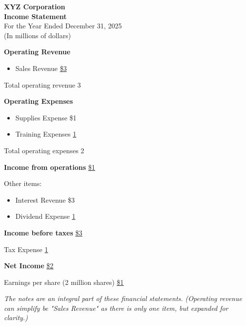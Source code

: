 \small
\begin{tcolorbox}[colframe=black,colback=white,title=Example Income Statement (Classified by Operating \& Non-operating)]
    \begin{center}
        \textbf{XYZ Corporation}\\
        \textbf{Income Statement}\\
        For the Year Ended December 31, 2025\\
        (In millions of dollars)
    \end{center}

    \textbf{Operating Revenue}
    \begin{itemize}[label={}, leftmargin=*]
        \item Sales Revenue \hfill \underline{\$3}
    \end{itemize}

    Total operating revenue \hfill 3

    \textbf{Operating Expenses}
    \begin{itemize}[label={}, leftmargin=*]
        \item Supplies Expense \hfill \$1
        \item Training Expenses \hfill \underline{1}
    \end{itemize}
    Total operating expenses \hfill 2

    \textbf{Income from operations} \hfill \underline{\underline{\$1}}


    Other items:
    \begin{itemize}[label={}, leftmargin=*]
        \item Interest Revenue \hfill \$3
        \item Dividend Expense \hfill \underline{1}
    \end{itemize}
    \textbf{Income before taxes} \hfill \underline{\underline{\$3}}

    Tax Expense \hfill \underline{1}


    \textbf{Net Income} \hfill \underline{\underline{\$2}}

    Earnings per share (2 million shares) \hfill \underline{\underline{\$1}}

    \vspace{1em}

    \textit{\footnotesize{The notes are an integral part of these financial statements. (Operating revenue can simplify be "Sales Revenue" as there is only one item, but expanded for clarity.)}}
\end{tcolorbox}

